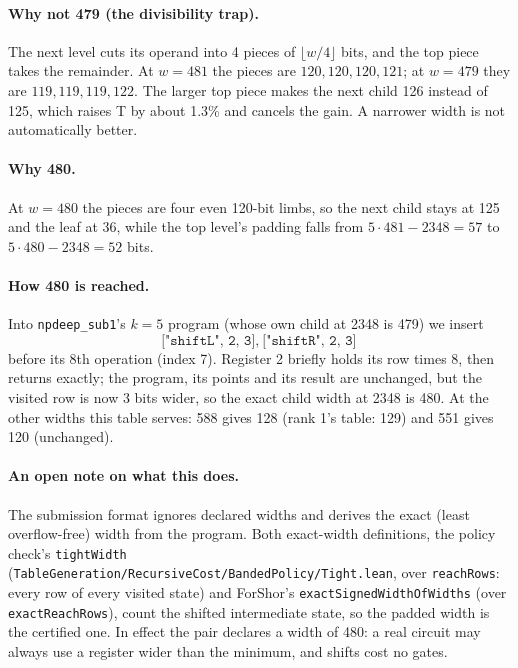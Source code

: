 \documentclass[11pt]{article}
\begin{document}
\paragraph{Why not 479 (the divisibility trap).} The next level cuts its operand into 4 pieces of $\lfloor w/4 \rfloor$
bits, and the top piece takes the remainder. At $w = 481$ the pieces are $120, 120, 120, 121$; at $w = 479$ they are
$119, 119, 119, 122$. The larger top piece makes the next child 126 instead of 125, which raises T by about 1.3\%
and cancels the gain. A narrower width is not automatically better.

\paragraph{Why 480.} At $w = 480$ the pieces are four even 120-bit limbs, so the next child stays at 125 and the leaf
at 36, while the top level's padding falls from $5 \cdot 481 - 2348 = 57$ to $5 \cdot 480 - 2348 = 52$ bits.

\paragraph{How 480 is reached.} Into \texttt{npdeep\_sub1}'s $k=5$ program (whose own child at 2348 is 479) we insert
\[ \texttt{["shiftL", 2, 3]},\ \texttt{["shiftR", 2, 3]} \]
before its 8th operation (index 7). Register 2 briefly holds its row times 8, then returns exactly; the program, its
points and its result are unchanged, but the visited row is now 3 bits wider, so the exact child width at 2348 is 480.
At the other widths this table serves: 588 gives 128 (rank 1's table: 129) and 551 gives 120 (unchanged).

\paragraph{An open note on what this does.} The submission format ignores declared widths and derives the exact
(least overflow-free) width from the program. Both exact-width definitions, the policy check's \texttt{tightWidth}
(\texttt{TableGeneration/RecursiveCost/BandedPolicy/Tight.lean}, over \texttt{reachRows}: every row of every visited
state) and ForShor's \texttt{exactSignedWidthOfWidths} (over \texttt{exactReachRows}), count the shifted intermediate
state, so the padded width is the certified one. In effect the pair declares a width of 480: a real circuit may always
use a register wider than the minimum, and shifts cost no gates.
\end{document}
